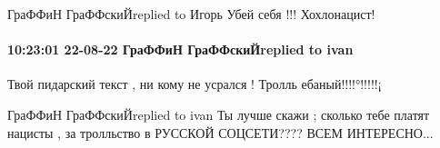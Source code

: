  
 
 
 
 

ГраФФиН ГраФФскиЙreplied to Игорь
Убей себя !!!
Хохлонацист!

\paragraph{10:23:01 22-08-22 ГраФФиН ГраФФскиЙreplied to ivan}

Твой пидарский текст , ни кому не усрался !
Тролль ебаный!!!!°!!!!!¡

ГраФФиН ГраФФскиЙreplied to ivan
Ты лучше скажи ;
сколько тебе платят нацисты , за тролльство в
РУССКОЙ СОЦСЕТИ????
ВСЕМ ИНТЕРЕСНО...
